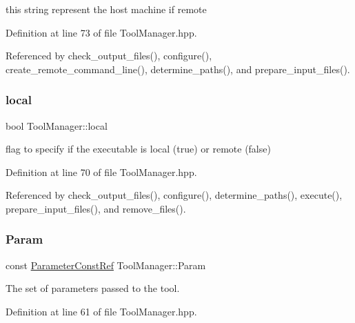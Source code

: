 this string represent the host machine if remote 



Definition at line 73 of file Tool\+Manager.\+hpp.



Referenced by check\+\_\+output\+\_\+files(), configure(), create\+\_\+remote\+\_\+command\+\_\+line(), determine\+\_\+paths(), and prepare\+\_\+input\+\_\+files().

\mbox{\label{classToolManager_a3502f131211bdc34bc3b95e16abe8e3f}} 
\subsubsection{\texorpdfstring{local}{local}}
{\footnotesize\ttfamily bool Tool\+Manager\+::local\hspace{0.3cm}{\ttfamily [protected]}}



flag to specify if the executable is local (true) or remote (false) 



Definition at line 70 of file Tool\+Manager.\+hpp.



Referenced by check\+\_\+output\+\_\+files(), configure(), determine\+\_\+paths(), execute(), prepare\+\_\+input\+\_\+files(), and remove\+\_\+files().

\mbox{\label{classToolManager_ae9a9aa4672305bbf4ce1f28d4472b0eb}} 
\subsubsection{\texorpdfstring{Param}{Param}}
{\footnotesize\ttfamily const \hyperlink{Parameter_8hpp_a37841774a6fcb479b597fdf8955eb4ea}{Parameter\+Const\+Ref} Tool\+Manager\+::\+Param\hspace{0.3cm}{\ttfamily [protected]}}



The set of parameters passed to the tool. 



Definition at line 61 of file Tool\+Manager.\+hpp.



